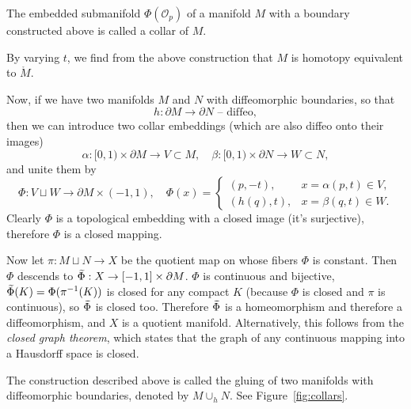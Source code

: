 \begin{defn}[Collar]
    The embedded submanifold $\Phi(\mathcal{O}_p)$ of a manifold $M$ with a boundary constructed above is called a collar of $M$.
\end{defn}

\begin{cor}
    By varying $t$, we find from the above construction that $M$ is homotopy equivalent to $\mathring{M}$.
\end{cor}

Now, if we have two manifolds $M$ and $N$ with diffeomorphic boundaries, so that
\[h:\partial M\to \partial N\text{ -- diffeo},\]
then we can introduce two collar embeddings (which are also diffeo onto their images)
\[
\alpha:[0,1)\times\partial M\to V\subset M,\quad
\beta:[0,1)\times\partial N\to W\subset N,
\]
and unite them by
\[
\Phi: V\sqcup W\to \partial M\times (-1,1),\quad \Phi(x)=
\begin{cases}
(p,-t),& x=\alpha(p,t)\in V,\\
(h(q),t),& x=\beta(q,t)\in W.
\end{cases}
\]
Clearly $\Phi$  is a topological embedding with a closed image (it's surjective), therefore $\Phi$ is a closed mapping.

Now let $\pi:M\sqcup N\to X$ be the quotient map on whose fibers $\Phi$ is constant. Then $\Phi$ descends to $\wt{\Phi}:X\to [-1,1]\times\partial M$. $\Phi$ is continuous and bijective, $\wt{\Phi}(K)=\Phi(\pi^{-1}(K))$ is closed for any compact $K$ (because $\Phi$ is closed and $\pi$ is continuous), so $\wt{\Phi}$ is closed too. Therefore $\wt{\Phi}$ is a homeomorphism and therefore a diffeomorphism, and $X$ is a quotient manifold. Alternatively, this follows from the \emph{closed graph theorem}, which states that the graph of any continuous mapping into a Hausdorff space is closed.

\begin{defn}
    The construction described above is called the gluing of two manifolds with diffeomorphic boundaries, denoted by $M\cup_h N$. See Figure~\ref{fig:collars}.
\end{defn}


